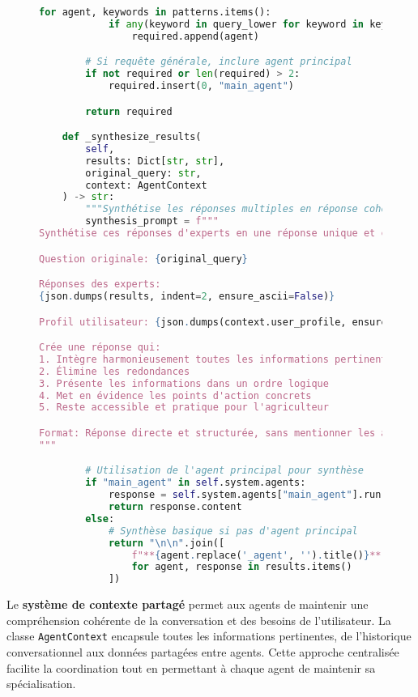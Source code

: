\begin{figure}[h]
\begin{lstlisting}[language=Python, caption=Système de gestion du contexte inter-agents]
        for agent, keywords in patterns.items():
            if any(keyword in query_lower for keyword in keywords):
                required.append(agent)

        # Si requête générale, inclure agent principal
        if not required or len(required) > 2:
            required.insert(0, "main_agent")

        return required

    def _synthesize_results(
        self,
        results: Dict[str, str],
        original_query: str,
        context: AgentContext
    ) -> str:
        """Synthétise les réponses multiples en réponse cohérente."""
        synthesis_prompt = f"""
Synthétise ces réponses d'experts en une réponse unique et cohérente.

Question originale: {original_query}

Réponses des experts:
{json.dumps(results, indent=2, ensure_ascii=False)}

Profil utilisateur: {json.dumps(context.user_profile, ensure_ascii=False)}

Crée une réponse qui:
1. Intègre harmonieusement toutes les informations pertinentes
2. Élimine les redondances
3. Présente les informations dans un ordre logique
4. Met en évidence les points d'action concrets
5. Reste accessible et pratique pour l'agriculteur

Format: Réponse directe et structurée, sans mentionner les agents individuels.
"""

        # Utilisation de l'agent principal pour synthèse
        if "main_agent" in self.system.agents:
            response = self.system.agents["main_agent"].run(synthesis_prompt)
            return response.content
        else:
            # Synthèse basique si pas d'agent principal
            return "\n\n".join([
                f"**{agent.replace('_agent', '').title()}**: {response}"
                for agent, response in results.items()
            ])
\end{lstlisting}
\end{figure}

Le \textbf{système de contexte partagé} permet aux agents de maintenir une compréhension cohérente de la conversation et des besoins de l'utilisateur. La classe \texttt{AgentContext} encapsule toutes les informations pertinentes, de l'historique conversationnel aux données partagées entre agents. Cette approche centralisée facilite la coordination tout en permettant à chaque agent de maintenir sa spécialisation.

